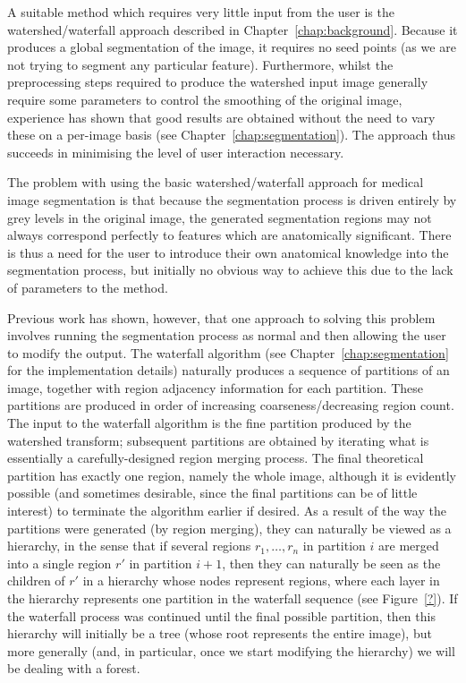 A suitable method which requires very little input from the user is the watershed/waterfall approach \cite{beucher94,marcotegui05} described in Chapter~\ref{chap:background}. Because it produces a global segmentation of the image, it requires no seed points (as we are not trying to segment any particular feature). Furthermore, whilst the preprocessing steps required to produce the watershed input image generally require some parameters to control the smoothing of the original image, experience has shown that good results are obtained without the need to vary these on a per-image basis (see Chapter~\ref{chap:segmentation}). The approach thus succeeds in minimising the level of user interaction necessary.

The problem with using the basic watershed/waterfall approach for medical image segmentation is that because the segmentation process is driven entirely by grey levels in the original image, the generated segmentation regions may not always correspond perfectly to features which are anatomically significant. There is thus a need for the user to introduce their own anatomical knowledge into the segmentation process, but initially no obvious way to achieve this due to the lack of parameters to the method.

Previous work \cite{yoo91} has shown, however, that one approach to solving this problem involves running the segmentation process as normal and then allowing the user to modify the output. The waterfall algorithm (see Chapter~\ref{chap:segmentation} for the implementation details) naturally produces a sequence of partitions of an image, together with region adjacency information for each partition. These partitions are produced in order of increasing coarseness/decreasing region count. The input to the waterfall algorithm is the fine partition produced by the watershed transform; subsequent partitions are obtained by iterating what is essentially a carefully-designed region merging process. The final theoretical partition has exactly one region, namely the whole image, although it is evidently possible (and sometimes desirable, since the final partitions can be of little interest) to terminate the algorithm earlier if desired. As a result of the way the partitions were generated (by region merging), they can naturally be viewed as a hierarchy, in the sense that if several regions $r_1,\ldots,r_n$ in partition $i$ are merged into a single region $r'$ in partition $i+1$, then they can naturally be seen as the children of $r'$ in a hierarchy whose nodes represent regions, where each layer in the hierarchy represents one partition in the waterfall sequence (see Figure~\ref{?}). If the waterfall process was continued until the final possible partition, then this hierarchy will initially be a tree (whose root represents the entire image), but more generally (and, in particular, once we start modifying the hierarchy) we will be dealing with a forest.

